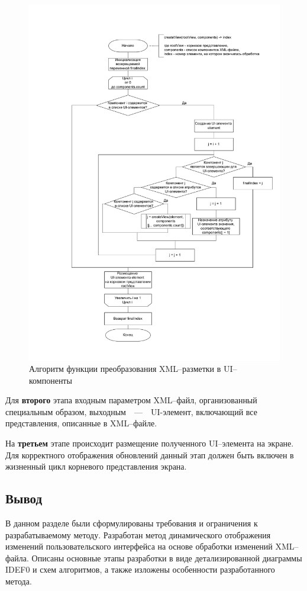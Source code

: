 \begin{figure}[!htb]
	\centering
	\includegraphics[scale=0.55]{img/createView.pdf}
	\caption{Алгоритм функции преобразования XML--разметки в UI--компоненты}
	\label{fig:createView}
\end{figure}
\clearpage

Для \textbf{второго} этапа входным параметром XML--файл, организованный специальным образом, выходным~~---~~UI-элемент, включающий все представления, описанные в XML--файле.

На \textbf{третьем} этапе происходит размещение полученного UI--элемента на экране. 
Для корректного отображения обновлений данный этап должен быть включен в жизненный цикл корневого представления экрана.


\subsection*{Вывод}

В данном разделе были сформулированы требования и ограничения к разрабатываемому методу. 
Разработан метод динамического отображения изменений пользовательского интерфейса на основе обработки изменений XML--файла.
Описаны основные этапы разработки в виде детализированной диаграммы IDEF0 и схем алгоритмов, а также изложены особенности разработанного метода. 

\pagebreak